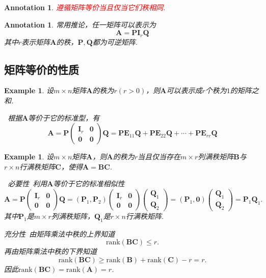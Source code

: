 \documentclass{article}
\newtheorem{example}[theorem]{Example}
\newtheorem{annotation}[theorem]{Annotation}
\newcommand{\hints}{{\color{blue} \text{hints}}}
\newcommand{\mbf}[1]{\bm{#1}}
\newcommand{\rank}[1]{\text{rank}\left(#1\right)} %
\newcommand{\redt}[1]{\textcolor{red}{#1}}
\begin{document}
\begin{annotation}
\rm \redt{遵循矩阵等价当且仅当它们秩相同}.
\end{annotation}

\begin{annotation}
\rm 常用推论，任一矩阵可以表示为
$$
\mbf{A} = \mbf{P} \mbf{I}_r \mbf{Q}
$$
其中$r$表示矩阵$\mbf{A}$的秩，$\mbf{P},\mbf{Q}$都为可逆矩阵. 
\end{annotation}

\subsection{矩阵等价的性质}

\begin{example}
\rm 设$m \times n$矩阵$\mbf{A}$的秩为$r(r>0)$，则$\mbf{A}$可以表示成$r$个秩为$1$的矩阵之和. 

\hints\ 根据$\mbf{A}$等价于它的标准型，有
$$
\mbf{A} = \mbf{P}\begin{pmatrix}
\mbf{I}_r & \mbf{0} \\
\mbf{0} & \mbf{0}
\end{pmatrix}\mbf{Q} = \mbf{P}\mbf{E}_{11}\mbf{Q} + \mbf{P}\mbf{E}_{22}\mbf{Q} + \cdots + \mbf{P}\mbf{E}_{rr}\mbf{Q}
$$
\end{example}

\begin{example}
\rm 设$m \times n$矩阵$\mbf{A}$，则$\mbf{A}$的秩为$r$当且仅当存在$m \times r$列满秩矩阵$\mbf{B}$与$r \times n$行满秩矩阵$\mbf{C}$，使得$\mbf{A}=\mbf{B}\mbf{C}$. 

\hints\ \emph{必要性}\ 利用$\mbf{A}$等价于它的标准相似性
$$
\mbf{A} = \mbf{P}\begin{pmatrix}
\mbf{I}_r & \mbf{0} \\
\mbf{0} & \mbf{0}
\end{pmatrix}\mbf{Q} = (\mbf{P}_1, \mbf{P}_2)\begin{pmatrix}
\mbf{I}_r & \mbf{0} \\
\mbf{0} & \mbf{0}
\end{pmatrix}\begin{pmatrix}
\mbf{Q}_1 \\
\mbf{Q}_2 
\end{pmatrix} = (\mbf{P}_1, \mbf{0})\begin{pmatrix}
\mbf{Q}_1 \\
\mbf{Q}_2 
\end{pmatrix} = \mbf{P}_1\mbf{Q}_1.
$$
其中$\mbf{P}_1$是$m \times r$列满秩矩阵，$\mbf{Q}_1$是$r \times n$行满秩矩阵. 

\emph{充分性}\ 由矩阵乘法中秩的上界知道
$$
\rank{\mbf{BC}} \leq r.
$$ 
再由矩阵乘法中秩的下界知道
$$
\rank{\mbf{BC}} \geq \rank{\mbf{B}} + \rank{\mbf{C}} -r =r.
$$
因此$\rank{\mbf{BC}} = \rank{\mbf{A}} = r$. 
\end{example}
\end{document}
